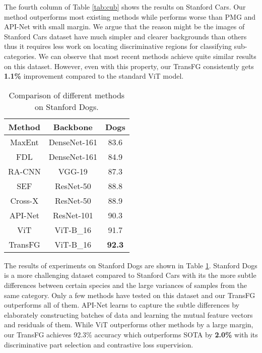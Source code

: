 \documentclass[10pt,twocolumn,letterpaper]{article}
\begin{document}
The fourth column of Table \ref{tab:cub} shows the results on Stanford Cars. Our method outperforms most existing methods while performs worse than PMG \cite{du2020fine} and API-Net \cite{zhuang2020learning} with small margin. We argue that the reason might be the images of Stanford Cars dataset have much simpler and clearer backgrounds than others thus it requires less work on locating discriminative regions for classifying sub-categories. We can observe that most recent methods achieve quite similar results on this dataset. However, even with this property, our TransFG consistently gets \textbf{1.1\%} improvement compared to the standard ViT model.

\begin{table}[]
    \small
    \centering
    \caption{Comparison of different methods on Stanford Dogs.}
    \label{tab:dog}
    \begin{tabular}{c|c|c}
    \hline
    Method & Backbone & Dogs \\ \hline
    MaxEnt \cite{NEURIPS2018_0c74b7f7} & DenseNet-161 & 83.6 \\ 
    FDL \cite{liu2020filtration} & DenseNet-161 & 84.9 \\
    RA-CNN \cite{fu2017look} & VGG-19 & 87.3 \\
    SEF \cite{luo2020learning} & ResNet-50 & 88.8 \\
    Cross-X \cite{luo2019cross} & ResNet-50 & 88.9 \\
    API-Net \cite{zhuang2020learning} & ResNet-101 & 90.3 \\ \hline
    ViT \cite{dosovitskiy2020image} & ViT-B\_16 & 91.7 \\ 
    TransFG & ViT-B\_16 & \textbf{92.3} \\ \hline
    \end{tabular}
\end{table}

The results of experiments on Stanford Dogs are shown in Table \ref{tab:dog}. Stanford Dogs is a more challenging dataset compared to Stanford Cars with its the more subtle differences between certain species and the large variances of samples from the same category. Only a few methods have tested on this dataset and our TransFG outperforms all of them. API-Net \cite{zhuang2020learning} learns to capture the subtle differences by elaborately constructing batches of data and learning the mutual feature vectors and residuals of them. While ViT \cite{dosovitskiy2020image} outperforms other methods by a large margin, our TransFG achieves 92.3\% accuracy which outperforms SOTA by \textbf{2.0\%} with its discriminative part selection and contrastive loss supervision.
\end{document}
